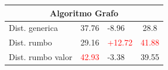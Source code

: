 \documentclass[12pt,a4paper]{article}
\begin{document}
\begin{table}[H]
\begin{tabular}{l|c|l|c|}
\hline
\multicolumn{4}{c}{{\cellcolor[rgb]{0.796,0.808,0.984}}Algoritmo Grafo}                                                                                                              \\ 
\hline
\rowcolor[rgb]{0.925,0.957,1} Dist. generica                           & 37.76                             & -8.96                              & 28.8                               \\
\rowcolor[rgb]{0.855,0.91,0.988} Dist. rumbo                           & \textcolor[rgb]{0,0.502,0}{29.16} & \textcolor{red}{+12.72}            & \textcolor{red}{41.88}             \\
\rowcolor[rgb]{0.925,0.957,1} Dist. rumbo valor                        & \textcolor{red}{42.93}            & -3.38                              & 39.55                             
\end{tabular}
\end{table}
	
\end{document}
